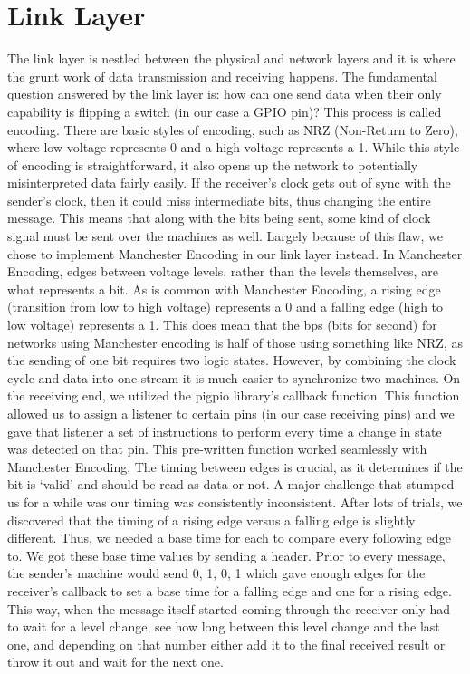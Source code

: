 \documentclass[10pt, letterpaper, twocolumn]{article}
\begin{document}
\section{Link Layer}
The link layer is nestled between the physical and network layers and it is where the grunt work of data transmission and receiving happens. The fundamental question answered by the link layer is: how can one send data when their only capability is flipping a switch (in our case a GPIO pin)? This process is called encoding. There are basic styles of encoding, such as NRZ (Non-Return to Zero), where low voltage represents 0 and a high voltage represents a 1. While this style of encoding is straightforward, it also opens up the network to potentially misinterpreted data fairly easily. If the receiver's clock gets out of sync with the sender's clock, then it could miss intermediate bits, thus changing the entire message. This means that along with the bits being sent, some kind of clock signal must be sent over the machines as well. Largely because of this flaw, we chose to implement Manchester Encoding in our link layer instead. In Manchester Encoding, edges between voltage levels, rather than the levels themselves, are what represents a bit. As is common with Manchester Encoding, a rising edge (transition from low to high voltage)  represents a 0 and a falling edge (high to low voltage) represents a 1. This does mean that the bps (bits for second) for networks using Manchester encoding is half of those using something like NRZ, as the sending of one bit requires two logic states. However, by combining the clock cycle and data into one stream it is much easier to synchronize two machines. On the receiving end, we utilized the pigpio library’s callback function. This function allowed us to assign a listener to certain pins (in our case receiving pins) and we gave that listener a set of instructions to perform every time a change in state was detected on that pin. This pre-written function worked seamlessly with Manchester Encoding. The timing between edges is crucial, as it determines if the bit is ‘valid’ and should be read as data or not. A major challenge that stumped us for a while was our timing was consistently inconsistent. After lots of trials, we discovered that the timing of a rising edge versus a falling edge is slightly different. Thus, we needed a base time for each to compare every following edge to. We got these base time values by sending a header. Prior to every message, the sender’s machine would send {0, 1, 0, 1} which gave enough edges for the receiver’s callback to set a base time for a falling edge and one for a rising edge. This way, when the message itself started coming through the receiver only had to wait for a level change, see how long between this level change and the last one, and depending on that number either add it to the final received result or throw it out and wait for the next one. 
\end{document}
